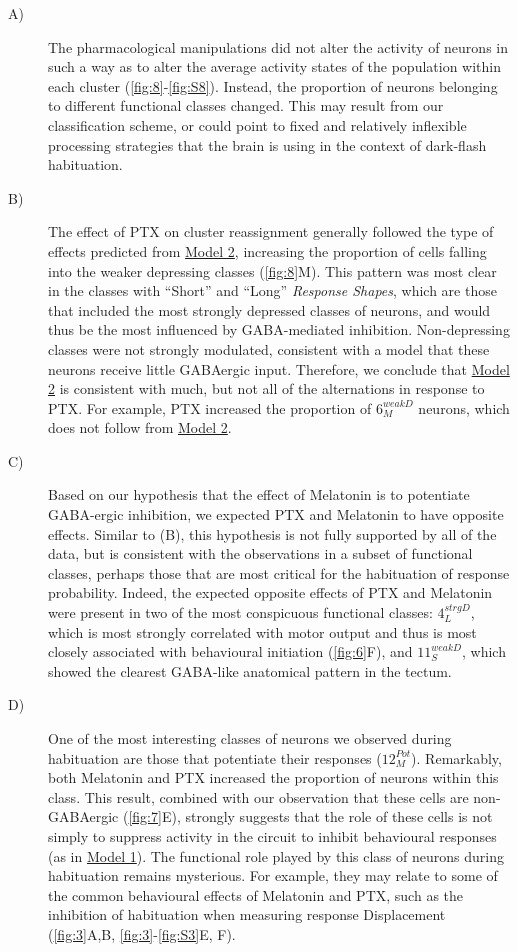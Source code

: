 \documentclass[9pt,lineno]{RandlettLab_elife}
\begin{document}
\begin{description}
\item[A)]
The pharmacological manipulations did not alter the activity of neurons in such a way as to alter the average activity states of the population within each cluster (\autoref{fig:8}-\autoref{fig:S8}). Instead, the proportion of neurons belonging to different functional classes changed. This may result from our classification scheme, or could point to fixed and relatively inflexible processing strategies that the brain is using in the context of dark-flash habituation.
\vspace{2mm}
\item[B)]
The effect of PTX on cluster reassignment generally followed the type of effects predicted from \underline{Model 2}, increasing the proportion of cells falling into the weaker depressing classes (\autoref{fig:8}M). This pattern was most clear in the classes with “Short” and “Long” \emph{Response Shapes}, which are those that included the most strongly depressed classes of neurons, and would thus be the most influenced by GABA-mediated inhibition. Non-depressing classes were not strongly modulated, consistent with a model that these neurons receive little GABAergic input. Therefore, we conclude that \underline{Model 2} is consistent with much, but not all of the alternations in response to PTX. For example, PTX increased the proportion of $6_{M}^{weakD}$ neurons, which does not follow from \underline{Model 2}.
\vspace{2mm}
\item[C)] 
Based on our hypothesis that the effect of Melatonin is to potentiate GABA-ergic inhibition, we expected PTX and Melatonin to have opposite effects. Similar to (B), this hypothesis is not fully supported by all of the data, but is consistent with the observations in a subset of functional classes, perhaps those that are most critical for the habituation of response probability. Indeed, the expected opposite effects of PTX and Melatonin were present in two of the most conspicuous functional classes: $4_{L}^{strgD}$, which is most strongly correlated with motor output and thus is most closely associated with behavioural initiation (\autoref{fig:6}F), and $11_{S}^{weakD}$, which showed the clearest GABA-like anatomical pattern in the tectum. 
\vspace{2mm}
\item[D)]
One of the most interesting classes of neurons we observed during habituation are those that potentiate their responses ($12_{M}^{Pot}$). Remarkably, both Melatonin and PTX increased the proportion of neurons within this class. This result, combined with our observation that these cells are non-GABAergic (\autoref{fig:7}E), strongly suggests that the role of these cells is not simply to suppress activity in the circuit to inhibit behavioural responses (as in \underline{Model 1}). The functional role played by this class of neurons during habituation remains mysterious. For example, they may relate to some of the common behavioural effects of Melatonin and PTX, such as the inhibition of habituation when measuring response Displacement (\autoref{fig:3}A,B, \autoref{fig:3}-\autoref{fig:S3}E, F). 


\end{description}
\end{document}
